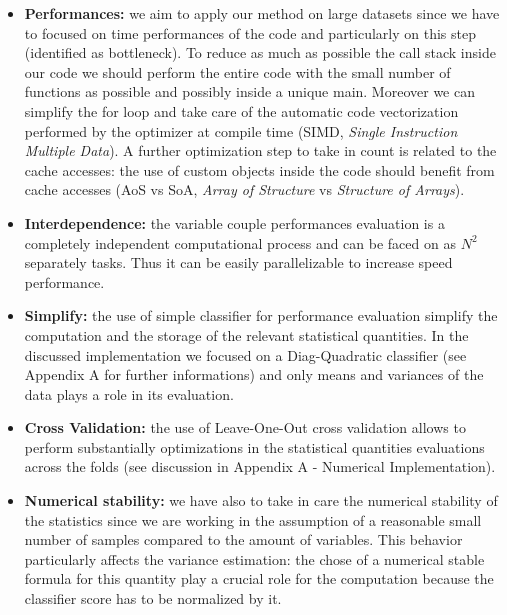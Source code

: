 \documentclass{standalone}
\begin{document}
\begin{itemize}

\item \textbf{Performances:} we aim to apply our method on large datasets since we have to focused on time performances of the code and particularly on this step (identified as bottleneck).
To reduce as much as possible the call stack inside our code we should perform the entire code with the small number of functions as possible and possibly inside a unique main.
Moreover we can simplify the for loop and take care of the automatic code vectorization performed by the optimizer at compile time (SIMD, \emph{Single Instruction Multiple Data}).
A further optimization step to take in count is related to the cache accesses: the use of custom objects inside the code should benefit from cache accesses (AoS vs SoA, \emph{Array of Structure} vs \emph{Structure of Arrays}).

\item \textbf{Interdependence:} the variable couple performances evaluation is a completely independent computational process and can be faced on as $N^2$ separately tasks.
Thus it can be easily parallelizable to increase speed performance.

\item \textbf{Simplify:} the use of simple classifier for performance evaluation simplify the computation and the storage of the relevant statistical quantities.
In the discussed implementation we focused on a Diag-Quadratic classifier (see Appendix A for further informations) and only means and variances of the data plays a role in its evaluation.

\item \textbf{Cross Validation:} the use of Leave-One-Out cross validation allows to perform substantially optimizations in the statistical quantities evaluations across the folds (see discussion in Appendix A - Numerical Implementation).

\item \textbf{Numerical stability:} we have also to take in care the numerical stability of the statistics since we are working in the assumption of a reasonable small number of samples compared to the amount of variables.
This behavior particularly affects the variance estimation: the chose of a numerical stable formula for this quantity play a crucial role for the computation because the classifier score has to be normalized by it.

\end{itemize}
\end{document}
